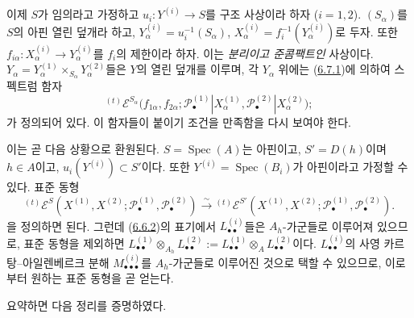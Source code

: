 \begin{env}[6.7.2]
\label{III.6.7.2-fr}
이제 $S$가 임의라고 가정하고 $u_i:Y^{(i)}\to S$를 구조 사상이라
하자 ($i=1,2$). $(S_\alpha)$를 $S$의 아핀 열린 덮개라 하고,
$Y_\alpha^{(i)}=u_i^{-1}(S_\alpha)$,
$X_\alpha^{(i)}=f_i^{-1}(Y_\alpha^{(i)})$로 두자. 또한
$f_{i\alpha}:X_\alpha^{(i)}\to Y_\alpha^{(i)}$를 $f_i$의 제한이라
하자. 이는 \emph{분리이고 준콤팩트인} 사상이다.
$Y_\alpha=Y_\alpha^{(1)}\times_{S_\alpha}Y_\alpha^{(2)}$들은 $Y$의
열린 덮개를 이루며, 각 $Y_\alpha$ 위에는
(\hyperref[III.6.7.1-fr]{6.7.1})에 의하여 스펙트럼 함자
\[
  {}^{(t)}\mathscr E^{S_\alpha}
  \bigl(f_{1\alpha},f_{2\alpha};
    \mathscr P_\bullet^{(1)}|X_\alpha^{(1)},
    \mathscr P_\bullet^{(2)}|X_\alpha^{(2)}\bigr);
\]
가 정의되어 있다. 이 함자들이 붙이기 조건을 만족함을 다시 보여야
한다.

이는 곧 다음 상황으로 환원된다. $S=\operatorname{Spec}(A)$는
아핀이고, $S'=D(h)$이며 $h\in A$이고,
$u_i(Y^{(i)})\subset S'$이다. 또한
$Y^{(i)}=\operatorname{Spec}(B_i)$가 아핀이라고 가정할 수 있다.
표준 동형
\[
  {}^{(t)}\mathscr E^S
  (X^{(1)},X^{(2)};
   \mathscr P_\bullet^{(1)},\mathscr P_\bullet^{(2)})
  \xrightarrow{\sim}
  {}^{(t)}\mathscr E^{S'}
  (X^{(1)},X^{(2)};
   \mathscr P_\bullet^{(1)},\mathscr P_\bullet^{(2)}).
  \tag{6.7.2.1}\label{III.6.7.2.1.fr}
\]
을 정의하면 된다. 그런데 (\hyperref[III.6.6.2-fr]{6.6.2})의
표기에서 $L_{\bullet\bullet}^{(i)}$들은 $A_h$-가군들로 이루어져
있으므로, 표준 동형을 제외하면
$L_{\bullet\bullet}^{(1)}\otimes_{A_h}L_{\bullet\bullet}^{(2)}
:=L_{\bullet\bullet}^{(1)}\otimes_A L_{\bullet\bullet}^{(2)}$이다.
$L_{\bullet\bullet}^{(i)}$의 사영 카르탕--아일렌베르크 분해
$M_{\bullet\bullet\bullet}^{(i)}$를 $A_h$-가군들로 이루어진 것으로
택할 수 있으므로, 이로부터 원하는 표준 동형을 곧 얻는다.
\end{env}

요약하면 다음 정리를 증명하였다.

